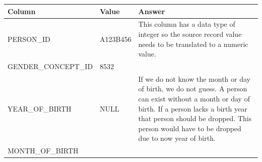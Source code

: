 \documentclass[10.5pt]{book}
\theoremstyle{definition}
\theoremstyle{definition}
\theoremstyle{definition}
\theoremstyle{remark}
\begin{document}
\begin{longtable}[]{@{}lll@{}}
\toprule
\begin{minipage}[b]{0.23\columnwidth}\raggedright\strut
Column\strut
\end{minipage} & \begin{minipage}[b]{0.16\columnwidth}\raggedright\strut
Value\strut
\end{minipage} & \begin{minipage}[b]{0.32\columnwidth}\raggedright\strut
Answer\strut
\end{minipage}\tabularnewline
\midrule
\endhead
\begin{minipage}[t]{0.23\columnwidth}\raggedright\strut
PERSON\_ID\strut
\end{minipage} & \begin{minipage}[t]{0.16\columnwidth}\raggedright\strut
A123B456\strut
\end{minipage} & \begin{minipage}[t]{0.32\columnwidth}\raggedright\strut
This column has a data type of integer so the source record value needs
to be translated to a numeric value.\strut
\end{minipage}\tabularnewline
\begin{minipage}[t]{0.23\columnwidth}\raggedright\strut
GENDER\_CONCEPT\_ID\strut
\end{minipage} & \begin{minipage}[t]{0.16\columnwidth}\raggedright\strut
8532\strut
\end{minipage} & \begin{minipage}[t]{0.32\columnwidth}\raggedright\strut
\strut
\end{minipage}\tabularnewline
\begin{minipage}[t]{0.23\columnwidth}\raggedright\strut
YEAR\_OF\_BIRTH\strut
\end{minipage} & \begin{minipage}[t]{0.16\columnwidth}\raggedright\strut
NULL\strut
\end{minipage} & \begin{minipage}[t]{0.32\columnwidth}\raggedright\strut
If we do not know the month or day of birth, we do not guess. A person
can exist without a month or day of birth. If a person lacks a birth
year that person should be dropped. This person would have to be dropped
due to now year of birth.\strut
\end{minipage}\tabularnewline
\begin{minipage}[t]{0.23\columnwidth}\raggedright\strut
MONTH\_OF\_BIRTH\strut

\end{minipage}
\end{longtable}
\end{document}
